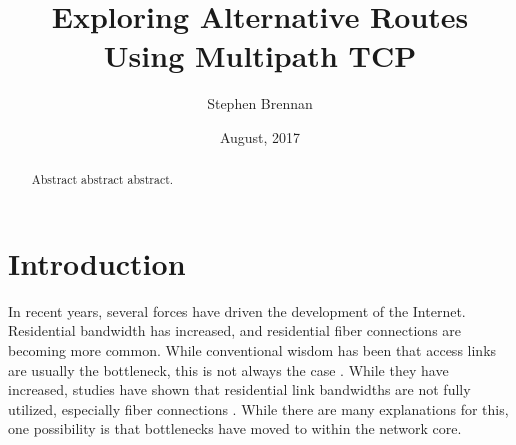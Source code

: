 \documentclass{cwru}
\title{Exploring Alternative Routes Using Multipath TCP}
\author{Stephen Brennan}
\date{August, 2017} %
\begin{document}

%

\maketitle
\makeapprovalsheet

\frontmatter
\tableofcontents

\cleardoublepage
{}
{}
\listoffigures





\acresetall

\begin{abstract}
Abstract abstract abstract.
\end{abstract}

\mainmatter
\chapter{Introduction}

In recent years, several forces have driven the development of the Internet.
Residential bandwidth has increased, and residential fiber connections are
becoming more common. %
While conventional wisdom has been that access links are usually the bottleneck,
this is not always the case \cite{akella2003empirical}. While they have
increased, studies have shown that residential link bandwidths are not fully
utilized, especially fiber connections \cite{fibertothehome}. While there are
many explanations for this, one possibility is that bottlenecks have moved to
within the network core.
\end{document}
